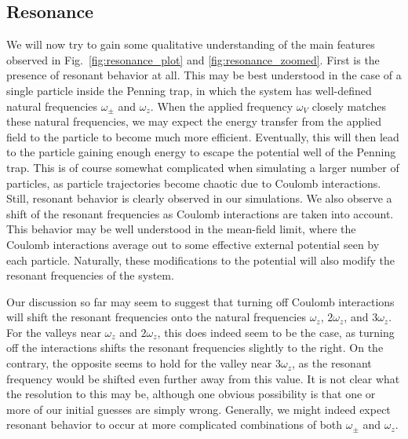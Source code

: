 \documentclass[english,notitlepage,reprint]{revtex4-2}  %
\begin{document}
\subsection{Resonance}
We will now try to gain some qualitative understanding of the main features observed in Fig.~\ref{fig:resonance_plot} and \ref{fig:resonance_zoomed}.
First is the presence of resonant behavior at all.
This may be best understood in the case of a single particle inside the Penning trap, in which the system has well-defined natural frequencies \(\omega_{\pm}\) and \(\omega_z\).
When the applied frequency \(\omega_V\) closely matches these natural frequencies, we may expect the energy transfer from the applied field to the particle to become much more efficient.
Eventually, this will then lead to the particle gaining enough energy to escape the potential well of the Penning trap.
This is of course somewhat complicated when simulating a larger number of particles, as particle trajectories become chaotic due to Coulomb interactions.
Still, resonant behavior is clearly observed in our simulations.
\newline
We also observe a shift of the resonant frequencies as Coulomb interactions are taken into account.
This behavior may be well understood in the mean-field limit, where the Coulomb interactions average out to some effective external potential seen by each particle.
Naturally, these modifications to the potential will also modify the resonant frequencies of the system.


Our discussion so far may seem to suggest that turning off Coulomb interactions will shift the resonant frequencies onto the natural frequencies $\omega_z$, $2\omega_z$, and $3\omega_z$.
For the valleys near $\omega_z$ and $2\omega_z$, this does indeed seem to be the case, as turning off the interactions shifts the resonant frequencies slightly to the right.
On the contrary, the opposite seems to hold for the valley near $3\omega_z$, as the resonant frequency would be shifted even further away from this value.
It is not clear what the resolution to this may be, although one obvious possibility is that one or more of our initial guesses are simply wrong.
Generally, we might indeed expect resonant behavior to occur at more complicated combinations of both \(\omega_{\pm}\) and \(\omega_z\).
\end{document}
